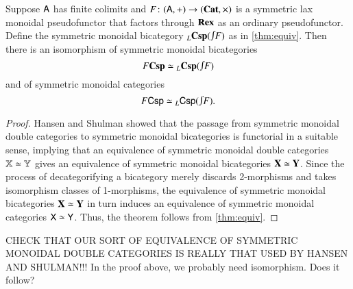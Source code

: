 \documentclass[reqno]{amsart}
\begin{document}
\begin{thm} \label{thm:bicat_equiv}
Suppose $\mathsf{A}$ has finite colimits and $F \colon(\mathsf{A},+) \to (\mathbf{Cat},\times)$ is a symmetric lax monoidal pseudofunctor that factors through $\mathbf{Rex}$ as an ordinary pseudofunctor.    Define the symmetric monoidal bicategory $_L\bCsp(\inta F)$ as in \cref{thm:equiv}.   Then there is an isomorphism of symmetric monoidal bicategories
\[      F\bCsp \simeq {}_L \bCsp(\inta F)   \]
and of symmetric monoidal categories
\[      F\Csp \simeq {}_L \Csp(\inta F)  . \]
\end{thm}

\begin{proof} Hansen and Shulman \cite{HS} showed that the passage from symmetric monoidal double categories to symmetric monoidal bicategories is  functorial in a suitable sense, implying
that an equivalence of symmetric monoidal double categories $\mathbf{\mathbb X} \simeq \mathbf{\mathbb Y}$ gives an equivalence of symmetric monoidal bicategories $\mathbf{X} \simeq \mathbf{Y}$.    Since the process of decategorifying a bicategory merely discards 2-morphisms and takes isomorphism classes of 1-morphisms, the equivalence of symmetric monoidal bicategories $\mathbf{X} \simeq \mathbf{Y}$ in turn induces an equivalence of symmetric monoidal categories $\mathsf{X} \simeq \mathsf{Y}$.   Thus, the theorem follows from \cref{thm:equiv}. \end{proof}

CHECK THAT OUR SORT OF EQUIVALENCE OF SYMMETRIC MONOIDAL DOUBLE CATEGORIES IS REALLY THAT USED BY HANSEN AND SHULMAN!!!
{\chris In the proof above, we probably need isomorphism. Does it follow?}
\end{document}
